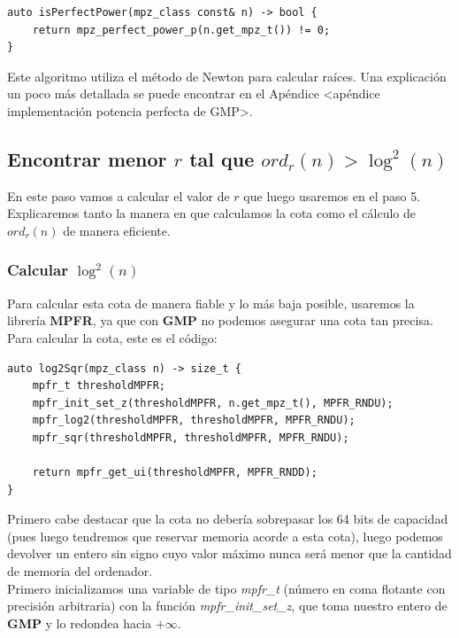 \begin{lstlisting}
auto isPerfectPower(mpz_class const& n) -> bool {
	return mpz_perfect_power_p(n.get_mpz_t()) != 0;
}
\end{lstlisting}

Este algoritmo utiliza el método de Newton para calcular raíces. Una explicación un poco más detallada se puede encontrar en el Apéndice <apéndice implementación potencia perfecta de GMP>.

\subsection{Encontrar menor $r$ tal que $ord_r(n) > \log^2(n)$}

En este paso vamos a calcular el valor de $r$ que luego usaremos en el paso 5. Explicaremos tanto la manera en que calculamos la cota como el cálculo de $ord_r(n)$ de manera eficiente.

\subsubsection{Calcular $\log^2(n)$}

Para calcular esta cota de manera fiable y lo más baja posible, usaremos la librería \textbf{MPFR}, ya que con \textbf{GMP} no podemos asegurar una cota tan precisa. Para calcular la cota, este es el código:\\

\begin{lstlisting}
auto log2Sqr(mpz_class n) -> size_t {
	mpfr_t thresholdMPFR;
	mpfr_init_set_z(thresholdMPFR, n.get_mpz_t(), MPFR_RNDU);
	mpfr_log2(thresholdMPFR, thresholdMPFR, MPFR_RNDU);
	mpfr_sqr(thresholdMPFR, thresholdMPFR, MPFR_RNDU);
	
	return mpfr_get_ui(thresholdMPFR, MPFR_RNDD);
}
\end{lstlisting}

Primero cabe destacar que la cota no debería sobrepasar los 64 bits de capacidad (pues luego tendremos que reservar memoria acorde a esta cota), luego podemos devolver un entero sin signo cuyo valor máximo nunca será menor que la cantidad de memoria del ordenador.\\

Primero inicializamos una variable de tipo \textit{mpfr\_t} (número en coma flotante con precisión arbitraria) con la función \textit{mpfr\_init\_set\_z}, que toma nuestro entero de \textbf{GMP} y lo redondea hacia $+\infty$.\\

